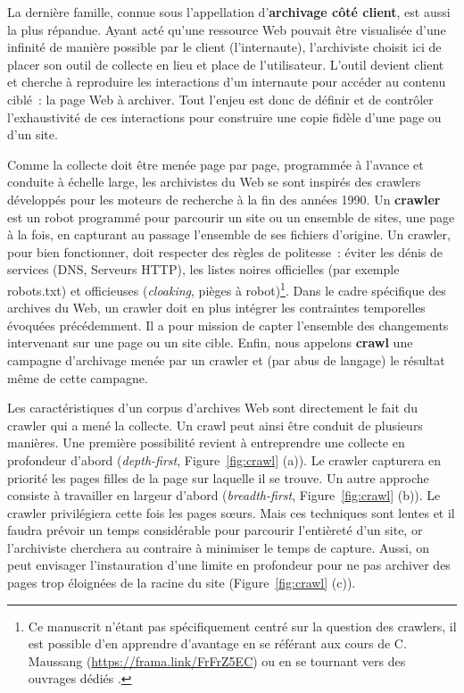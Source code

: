 \documentclass[symmetric,justified,marginals=raggedouter]{tufte-book}
\begin{document}
La dernière famille, connue sous l'appellation d'\textbf{archivage côté client}, est aussi la plus répandue. Ayant acté qu'une ressource Web pouvait être visualisée d'une infinité de manière possible par le client (l'internaute), l'archiviste choisit ici de placer son outil de collecte en lieu et place de l'utilisateur. L'outil devient client et cherche à reproduire les interactions d'un internaute pour accéder au contenu ciblé~: la page Web à archiver. Tout l'enjeu est donc de définir et de contrôler l'exhaustivité de ces interactions pour construire une copie fidèle d'une page ou d'un site. 

Comme la collecte doit être menée page par page, programmée à l'avance et conduite à échelle large, les archivistes du Web se sont inspirés des crawlers développés pour les moteurs de recherche \citep{pant_crawling_2004} à la fin des années 1990. Un \textbf{crawler} est un robot programmé pour parcourir un site ou un ensemble de sites, une page à la fois, en capturant au passage l'ensemble de ses fichiers d'origine. Un crawler, pour bien fonctionner, doit respecter des règles de politesse~: éviter les dénis de services (DNS, Serveurs HTTP), les listes noires officielles (par exemple robots.txt) et officieuses (\textit{cloaking}, pièges à robot)\footnote{\RaggedOuter Ce manuscrit n'étant pas spécifiquement centré sur la question des crawlers, il est possible d'en apprendre d'avantage en se référant aux cours de C. Maussang (\url{https://frama.link/FrFrZ5EC}) ou en se tournant vers des ouvrages dédiés \citep{chakrabarti_mining_2002,mitchell_web_2015}.}. Dans le cadre spécifique des archives du Web, un crawler doit en plus intégrer les contraintes temporelles évoquées précédemment. Il a pour mission de capter l'ensemble des changements intervenant sur une page ou un site cible. Enfin, nous appelons \textbf{crawl} une campagne d'archivage menée par un crawler et (par abus de langage) le résultat même de cette campagne. 

Les caractéristiques d'un corpus d'archives Web sont directement le fait du crawler qui a mené la collecte. Un crawl peut ainsi être conduit de plusieurs manières. Une première possibilité revient à entreprendre une collecte en profondeur d'abord (\textit{depth-first}, Figure~\ref{fig:crawl} (a)). Le crawler capturera en priorité les pages filles de la page sur laquelle il se trouve. Un autre approche consiste à travailler en largeur d'abord (\textit{breadth-first}, Figure~\ref{fig:crawl} (b)). Le crawler privilégiera cette fois les pages sœurs. Mais ces techniques sont lentes et il faudra prévoir un temps considérable pour parcourir l'entièreté d'un site, or l'archiviste cherchera au contraire à minimiser le temps de capture. Aussi, on peut envisager l'instauration d'une limite en profondeur pour ne pas archiver des pages trop éloignées de la racine du site (Figure~\ref{fig:crawl} (c)).
\end{document}
